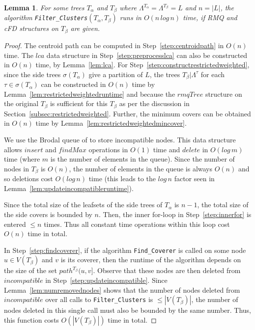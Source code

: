 \documentclass[final,1p,times]{elsarticle}
\newcommand{\leafset}{\Lambda}
\newcommand{\TA}{T_\alpha}
\newcommand{\TB}{T_\beta}
\newtheorem{lemma}[theorem]{Lemma}
\begin{document}
    \medskip
    \begin{lemma}
        \label{lem:filterclustersruntime}
        For some trees $\TA$ and $\TB$ where $\leafset^{\TA} = \leafset^{\TB} = L$ and $n = |L|$, the algorithm \texttt{Filter\_Clusters}$(\TA, \TB)$ runs in $O(n\,log\,n)$ time, if RMQ and cFD structures on $\TB$ are given.
    \end{lemma}
        \begin{proof}
            The centroid path can be computed in Step~\ref{step:centroidpath} in $O(n)$ time.  The $lca$ data structure in Step~\ref{step:preprocesslca} can also be constructed in $O(n)$ time, by Lemma~\ref{lem:lca}. For Step~\ref{step:constructrestrictedweighted}, since the side trees $\sigma(\TA)$ give a partition of $L$, the trees $\TB|\leafset^{\tau}$ for each $\tau \in \sigma(\TA)$ can be constructed in $O(n)$ time by Lemma~\ref{lem:restrictedweightedruntime} and because the $rmqTree$ structure on the original $\TB$ is sufficient for this $\TB$ as per the discussion in Section~\ref{subsec:restrictedweighted}. Further, the minimum covers can be obtained in $O(n)$ time by Lemma~\ref{lem:restrictedweightedmincover}.


            We use the Brodal queue of \cite{brodal1995fast} to store incompatible nodes. This data structure allows $insert$ and $findMax$ operations in $O(1)$ time and $delete$ in $O(log\,m)$ time (where $m$ is the number of elements in the queue). Since the number of nodes in $\TB$ is $O(n)$, the number of elements in the queue is always $O(n)$ and so deletions cost $O(log\,n)$ time (this leads to the $log\,n$ factor seen in Lemma~\ref{lem:updateincompatibleruntime}).

            Since the total size of the leafsets of the side trees of $\TA$ is $n - 1$, the total size of the side covers is bounded by $n$. Then, the inner for-loop in Step~\ref{step:innerfor} is entered $\leq n$ times. Thus all constant time operations within this loop cost $O(n)$ time in total.

            In Step~\ref{step:findcoverer}, if the algorithm \texttt{Find\_Coverer} is called on some node $u \in V(\TB)$ and $v$ is its coverer, then the runtime of the algorithm depends on the size of the set $path^{\TB}(u, v]$. Observe that these nodes are then deleted from $incompatible$ in Step~\ref{step:updateincompatible}. Since Lemma~\ref{lem:numremovednodes} shows that the number of nodes deleted from $incompatible$ over all calls to \texttt{Filter\_Clusters} is $\leq |V(\TB)|$, the number of nodes deleted in this single call must also be bounded by the same number. Thus, this function costs $O(|V(\TB)|)$ time in total.


\end{proof}
\end{document}
